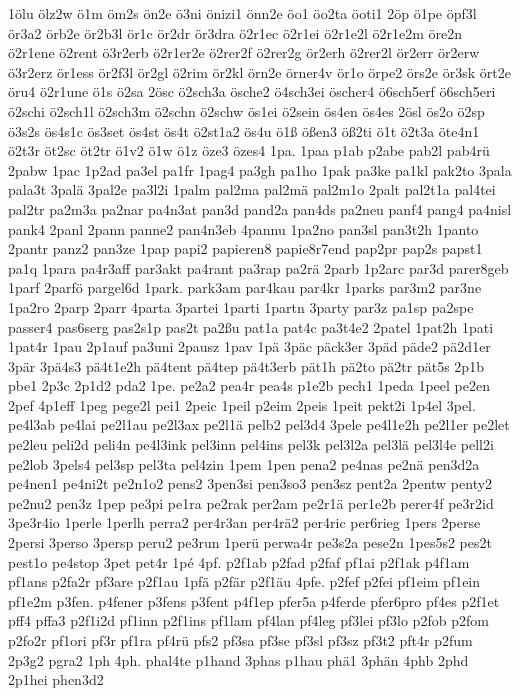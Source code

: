 {1ölu
ölz2w
ö1m
öm2s
ön2e
ö3ni
önizi1
önn2e
öo1
öo2ta
öoti1
2öp
ö1pe
öpf3l
ör3a2
örb2e
ör2b3l
ör1c
ör2dr
ör3dra
ö2r1ec
ö2r1ei
ö2r1e2l
ö2r1e2m
öre2n
ö2r1ene
ö2rent
ö3r2erb
ö2r1er2e
ö2rer2f
ö2rer2g
ör2erh
ö2rer2l
ör2err
ör2erw
ö3r2erz
ör1ess
ör2f3l
ör2gl
ö2rim
ör2kl
örn2e
örner4v
ör1o
örpe2
örs2e
ör3sk
ört2e
öru4
ö2r1une
ö1s
ö2sa
2ösc
ö2sch3a
ösche2
ö4sch3ei
öscher4
ö6sch5erf
ö6sch5eri
ö2schi
ö2sch1l
ö2sch3m
ö2schn
ö2schw
ös1ei
ö2sein
ös4en
ös4es
2ösl
ös2o
ö2sp
ö3s2s
ös4s1c
ös3set
ös4st
ös4t
ö2st1a2
ös4u
ö1ß
ößen3
öß2ti
ö1t
ö2t3a
öte4n1
ö2t3r
öt2sc
öt2tr
ö1v2
ö1w
ö1z
öze3
özes4
1pa.
1paa
p1ab
p2abe
pab2l
pab4rü
2pabw
1pac
1p2ad
pa3el
pa1fr
1pag4
pa3gh
pa1ho
1pak
pa3ke
pa1kl
pak2to
3pala
pala3t
3palä
3pal2e
pa3l2i
1palm
pal2ma
pal2mä
pal2m1o
2palt
pal2t1a
pal4tei
pal2tr
pa2m3a
pa2nar
pa4n3at
pan3d
pand2a
pan4ds
pa2neu
panf4
pang4
pa4nisl
pank4
2panl
2pann
panne2
pan4n3eb
4pannu
1pa2no
pan3sl
pan3t2h
1panto
2pantr
panz2
pan3ze
1pap
papi2
papieren8
papie8r7end
pap2pr
pap2s
papst1
pa1q
1para
pa4r3aff
par3akt
pa4rant
pa3rap
pa2rä
2parb
1p2arc
par3d
parer8geb
1parf
2parfö
pargel6d
1park.
park3am
par4kau
par4kr
1parks
par3m2
par3ne
1pa2ro
2parp
2parr
4parta
3partei
1parti
1partn
3party
par3z
pa1sp
pa2spe
passer4
pas6serg
pas2s1p
pas2t
pa2ßu
pat1a
pat4c
pa3t4e2
2patel
1pat2h
1pati
1pat4r
1pau
2p1auf
pa3uni
2pausz
1pav
1pä
3päc
päck3er
3päd
päde2
pä2d1er
3pär
3pä4s3
pä4t1e2h
pä4tent
pä4tep
pä4t3erb
pät1h
pä2to
pä2tr
pät5s
2p1b
pbe1
2p3c
2p1d2
pda2
1pe.
pe2a2
pea4r
pea4s
p1e2b
pech1
1peda
1peel
pe2en
2pef
4p1eff
1peg
pege2l
pei1
2peic
1peil
p2eim
2peis
1peit
pekt2i
1p4el
3pel.
pe4l3ab
pe4lai
pe2l1au
pe2l3ax
pe2l1ä
pelb2
pel3d4
3pele
pe4l1e2h
pe2l1er
pe2let
pe2leu
peli2d
peli4n
pe4l3ink
pel3inn
pel4ins
pel3k
pel3l2a
pel3lä
pel3l4e
pell2i
pe2lob
3pels4
pel3sp
pel3ta
pel4zin
1pem
1pen
pena2
pe4nas
pe2nä
pen3d2a
pe4nen1
pe4ni2t
pe2n1o2
pens2
3pen3si
pen3so3
pen3sz
pent2a
2pentw
penty2
pe2nu2
pen3z
1pep
pe3pi
pe1ra
pe2rak
per2am
pe2r1ä
per1e2b
perer4f
pe3r2id
3pe3r4io
1perle
1perlh
perra2
per4r3an
per4rä2
per4ric
per6rieg
1pers
2perse
2persi
3perso
3persp
peru2
pe3run
1perü
perwa4r
pe3s2a
pese2n
1pes5s2
pes2t
pest1o
pe4stop
3pet
pet4r
1pé
4pf.
p2f1ab
p2fad
p2faf
pf1ai
p2f1ak
p4f1am
pf1ans
p2fa2r
pf3are
p2f1au
1pfä
p2fär
p2f1äu
4pfe.
p2fef
p2fei
pf1eim
pf1ein
pf1e2m
p3fen.
p4fener
p3fens
p3fent
p4f1ep
pfer5a
p4ferde
pfer6pro
pf4es
p2f1et
pff4
pffa3
p2f1i2d
pf1inn
p2f1ins
pf1lam
pf4lan
pf4leg
pf3lei
pf3lo
p2fob
p2fom
p2fo2r
pf1ori
pf3r
pf1ra
pf4rü
pfs2
pf3sa
pf3se
pf3sl
pf3sz
pf3t2
pft4r
p2fum
2p3g2
pgra2
1ph
4ph.
phal4te
p1hand
3phas
p1hau
phä1
3phän
4phb
2phd
2p1hei
phen3d2
}
